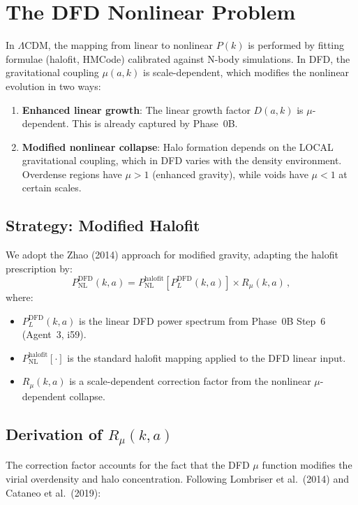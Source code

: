 \documentclass[11pt,a4paper]{article}
\begin{document}
\section{The DFD Nonlinear Problem}

In $\Lambda$CDM, the mapping from linear to nonlinear $P(k)$ is performed by fitting formulae (halofit, HMCode) calibrated against N-body simulations. In DFD, the gravitational coupling $\mu(a,k)$ is scale-dependent, which modifies the nonlinear evolution in two ways:

\begin{enumerate}
\item \textbf{Enhanced linear growth}: The linear growth factor $D(a,k)$ is $\mu$-dependent. This is already captured by Phase~0B.
\item \textbf{Modified nonlinear collapse}: Halo formation depends on the LOCAL gravitational coupling, which in DFD varies with the density environment. Overdense regions have $\mu > 1$ (enhanced gravity), while voids have $\mu < 1$ at certain scales.
\end{enumerate}

\subsection{Strategy: Modified Halofit}

We adopt the Zhao (2014) approach for modified gravity, adapting the halofit prescription by:
\begin{equation}
P_{\mathrm{NL}}^{\mathrm{DFD}}(k,a) = P_{\mathrm{NL}}^{\mathrm{halofit}}\left[P_L^{\mathrm{DFD}}(k,a)\right] \times R_{\mu}(k,a)\,,
\end{equation}
where:
\begin{itemize}
\item $P_L^{\mathrm{DFD}}(k,a)$ is the linear DFD power spectrum from Phase~0B Step~6 (Agent~3, i59).
\item $P_{\mathrm{NL}}^{\mathrm{halofit}}[\cdot]$ is the standard halofit mapping applied to the DFD linear input.
\item $R_\mu(k,a)$ is a scale-dependent correction factor from the nonlinear $\mu$-dependent collapse.
\end{itemize}

\subsection{Derivation of $R_\mu(k,a)$}

The correction factor accounts for the fact that the DFD $\mu$ function modifies the virial overdensity and halo concentration. Following Lombriser et al.\ (2014) and Cataneo et al.\ (2019):
\end{document}
